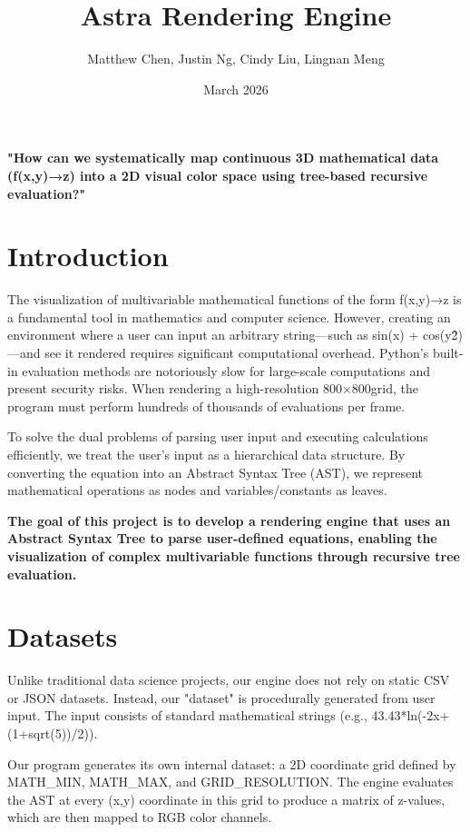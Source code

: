 \documentclass{article}
\title{Astra Rendering Engine}
\author{Matthew Chen, Justin Ng, Cindy Liu, Lingnan Meng}
\date{March 2026}
\begin{document}
\maketitle

\textbf{"How can we systematically map continuous 3D mathematical data (f(x,y)→z) into a 2D visual color space using tree-based recursive evaluation?"}

\section{\textbf{Introduction}}

The visualization of multivariable mathematical functions of the form f(x,y)→z is a fundamental tool in mathematics and computer science. However, creating an environment where a user can input an arbitrary string—such as sin(x) + cos(y\^2)—and see it rendered requires significant computational overhead. Python’s built-in evaluation methods are notoriously slow for large-scale computations and present security risks. When rendering a high-resolution 800×800grid, the program must perform hundreds of thousands of evaluations per frame.

    To solve the dual problems of parsing user input and executing calculations efficiently, we treat the user’s input as a hierarchical data structure. By converting the equation into an Abstract Syntax Tree (AST), we represent mathematical operations as nodes and variables/constants as leaves.

\textbf{The goal of this project is to develop a rendering engine that uses an Abstract Syntax Tree to parse user-defined equations, enabling the visualization of complex multivariable functions through recursive tree evaluation.}

\section{\textbf{Datasets}}

Unlike traditional data science projects, our engine does not rely on static CSV or JSON datasets. Instead, our "dataset" is procedurally generated from user input. The input consists of standard mathematical strings (e.g., 43.43*ln(-2x+(1+sqrt(5))/2)). 

Our program generates its own internal dataset: a 2D coordinate grid defined by MATH\_MIN, MATH\_MAX, and GRID\_RESOLUTION. The engine evaluates the AST at every (x,y) coordinate in this grid to produce a matrix of z-values, which are then mapped to RGB color channels.
\end{document}
